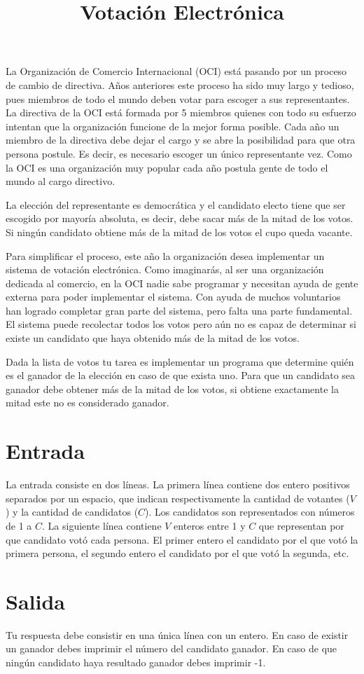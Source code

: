 \documentclass{article}
\title{Votación Electrónica}
\begin{document}
\maketitle

La Organización de Comercio Internacional (OCI) está pasando por un proceso de
cambio de directiva. Años anteriores este proceso ha sido muy largo y tedioso,
pues miembros de todo el mundo deben votar para escoger a sus representantes. La 
directiva de la OCI está formada por 5 miembros quienes con todo su esfuerzo
intentan que la organización funcione de la mejor forma posible. Cada año un
miembro de la directiva debe dejar el cargo y se abre la posibilidad para que
otra persona postule. Es decir, es necesario escoger un único representante vez.
Como la OCI es una organización muy popular cada año postula gente de todo el
mundo al cargo directivo.  

La elección del representante es democrática y el candidato electo tiene que ser
escogido por mayoría absoluta, es decir, debe sacar más de la mitad de los
votos. Si ningún candidato obtiene más de la mitad de los votos el cupo queda
vacante.

Para simplificar el proceso, este año la organización desea implementar un
sistema de votación electrónica. Como imaginarás, al ser una organización
dedicada al comercio, en la OCI nadie sabe programar y necesitan ayuda de gente
externa para poder implementar el sistema. Con ayuda de muchos voluntarios han
logrado completar gran parte del sistema, pero falta una parte fundamental. El
sistema puede recolectar todos los votos pero aún no es capaz de determinar si
existe un candidato que haya obtenido más de la mitad de los votos.

Dada la lista de votos tu tarea es implementar un programa que determine quién
es el ganador de la elección en caso de que exista uno. Para que un candidato
sea ganador debe obtener más de la mitad de los votos, si obtiene exactamente la
mitad este no es considerado ganador.

\section*{Entrada}
La entrada consiste en dos líneas. La primera línea contiene dos entero
positivos separados por un espacio, que indican respectivamente la cantidad de
votantes ($V$) y la cantidad de candidatos ($C$). Los candidatos son representados
con números de 1 a $C$. La siguiente línea contiene $V$ enteros entre 1 y $C$
que representan por que candidato votó cada persona. El primer entero el
candidato por el que votó la primera persona, el segundo entero el candidato por
el que votó la segunda, etc.

\section*{Salida}
Tu respuesta debe consistir en una única línea con un entero. En caso de existir
un ganador debes imprimir el número del candidato ganador. En caso de que ningún
candidato haya resultado ganador debes imprimir -1.
\end{document}
